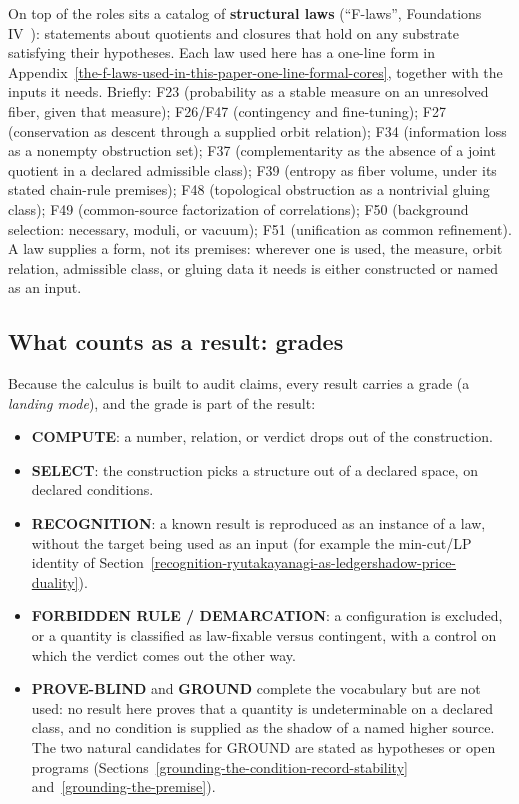 \documentclass[11pt]{article}
\theoremstyle{definition}
\providecommand{\tightlist}{\setlength{\itemsep}{0pt}\setlength{\parskip}{0pt}}
\begin{document}
On top of the roles sits a catalog of \textbf{structural laws} (``F-laws'', Foundations
IV~\citep{Tsiokos_FoundationsIV}): statements about quotients and closures that hold on any substrate satisfying their
hypotheses. Each law used here has a one-line form in Appendix~\ref{the-f-laws-used-in-this-paper-one-line-formal-cores},
together with the inputs it needs. Briefly:
F23 (probability as a stable measure on an unresolved fiber, given that measure);
F26/F47 (contingency and fine-tuning);
F27 (conservation as descent through a supplied orbit relation);
F34 (information loss as a nonempty obstruction set);
F37 (complementarity as the absence of a joint quotient in a declared admissible class);
F39 (entropy as fiber volume, under its stated chain-rule premises);
F48 (topological obstruction as a nontrivial gluing class);
F49 (common-source factorization of correlations);
F50 (background selection: necessary, moduli, or vacuum);
F51 (unification as common refinement).
A law supplies a form, not its premises: wherever one is used, the measure, orbit relation, admissible class, or
gluing data it needs is either constructed or named as an input.

\subsection{What counts as a result: grades}\label{what-counts-as-a-result-landing-modes}

Because the calculus is built to audit claims, every result carries a grade (a \emph{landing mode}), and the grade
is part of the result:

\begin{itemize}\tightlist
\item \textbf{COMPUTE}: a number, relation, or verdict drops out of the construction.
\item \textbf{SELECT}: the construction picks a structure out of a declared space, on declared conditions.
\item \textbf{RECOGNITION}: a known result is reproduced as an instance of a law, without the target being used as an
  input (for example the min-cut/LP identity of Section~\ref{recognition-ryutakayanagi-as-ledgershadow-price-duality}).
\item \textbf{FORBIDDEN RULE / DEMARCATION}: a configuration is excluded, or a quantity is classified as law-fixable
  versus contingent, with a control on which the verdict comes out the other way.
\item \textbf{PROVE-BLIND} and \textbf{GROUND} complete the vocabulary but are not used: no result here proves that a
  quantity is undeterminable on a declared class, and no condition is supplied as the shadow of a named higher source.
  The two natural candidates for GROUND are stated as hypotheses or open programs
  (Sections~\ref{grounding-the-condition-record-stability} and~\ref{grounding-the-premise}).
\end{itemize}
\end{document}
